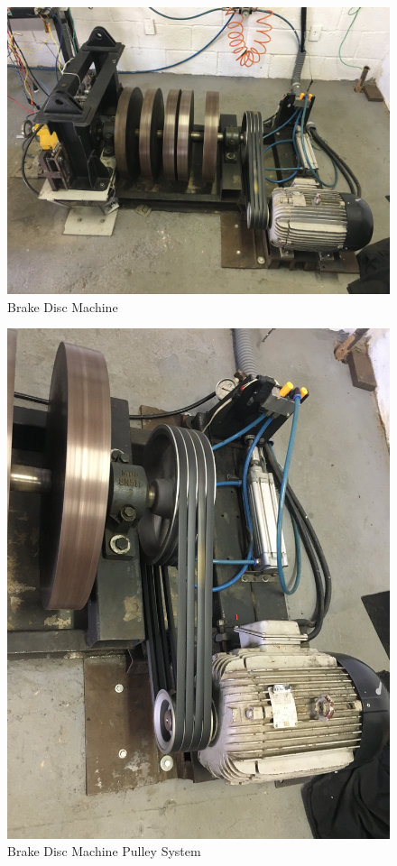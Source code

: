 		\begin{figure}[htbp]
			\centering
			\includegraphics[width=.7\textwidth]{figuras/fig-brake-disc-machine}
			\caption{Brake Disc Machine}
			\label{fig:brake-disc-machine}
		\end{figure}

		\begin{figure}[htbp]
			\centering
			\includegraphics[width=.7\textwidth]{figuras/fig-brake-disc-machine-pulley}
			\caption{Brake Disc Machine Pulley System}
			\label{fig:brake-disc-machine-pulley}
		\end{figure}

